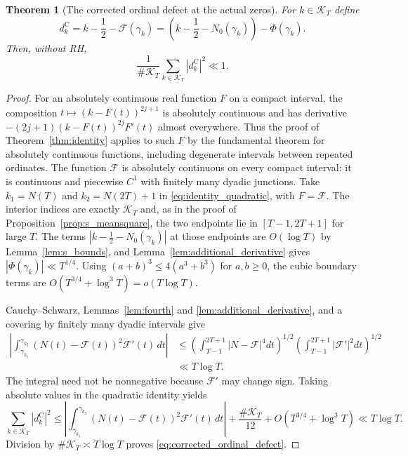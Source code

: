 \documentclass[11pt,a4paper]{article}
\makeatletter
\numberwithin{equation}{section}
\DeclareRobustCommand{\CGref}[1]{\ref{#1}}
\DeclareRobustCommand{\CGeqref}[1]{\eqref{#1}}
\let\CG@origref\ref
\let\CG@origeqref\eqref
\newcommand{\CG@gettip}[1]{\@ifundefined{CGTip@#1}{#1}{\csname CGTip@#1\endcsname}}
\DeclareRobustCommand{\CGref}[1]{\pdftooltip{\CG@origref{#1}}{\CG@gettip{#1}}}
\DeclareRobustCommand{\CGeqref}[1]{\pdftooltip{\CG@origeqref{#1}}{\CG@gettip{#1}}}
\newtheorem{theorem}{Theorem}[section]
\theoremstyle{definition}
\theoremstyle{remark}
\newcommand{\Nz}{N_0} %
\newcommand{\Fc}{\mathcal F}
\newcommand{\Ph}{\Phi}
\makeatother
\begin{document}
\begin{theorem}[The corrected ordinal defect at the actual zeros]\label{thm:corrected_ordinal_defect}
For $k\in\mathcal K_T$ define
\begin{equation}
 d_k^{\mathrm C}=k-\frac12-\Fc(\gamma_k)
 =\left(k-\frac12-\Nz(\gamma_k)\right)-\Ph(\gamma_k).
\label{eq:disp_43}
\end{equation}
Then, without RH,
\begin{equation}
\frac1{\#\mathcal K_T}\sum_{k\in\mathcal K_T}
|d_k^{\mathrm C}|^2\ll1.
\label{eq:corrected_ordinal_defect}
\end{equation}
\end{theorem}
\begin{proof}
For an absolutely continuous real function $F$ on a compact interval,
the composition $t\mapsto(k-F(t))^{2j+1}$ is absolutely continuous
and has derivative $-(2j+1)(k-F(t))^{2j}F'(t)$ almost everywhere.
Thus the proof of Theorem~\CGref{thm:identity} applies to such $F$
by the fundamental theorem for absolutely continuous functions,
including degenerate intervals between repeated ordinates.
The function $\Fc$ is absolutely continuous on every compact interval:
it is continuous and piecewise $C^1$ with finitely many dyadic junctions.
Take $k_1=N(T)$ and $k_2=N(2T)+1$ in
\CGeqref{eq:identity_quadratic}, with $F=\Fc$. The interior indices are
exactly $\mathcal K_T$ and, as in the proof of
Proposition~\CGref{prop:s_meansquare}, the two endpoints lie in
$[T-1,2T+1]$ for large $T$. The terms
$|k-\frac12-\Nz(\gamma_k)|$ at those endpoints are $O(\log T)$ by
Lemma~\CGref{lem:s_bounds}, and Lemma~\CGref{lem:additional_derivative}
gives $|\Ph(\gamma_k)|\ll T^{1/4}$.
Using $(a+b)^3\le4(a^3+b^3)$ for $a,b\ge0$, the cubic boundary terms are $O(T^{3/4}+\log^3T)=o(T\log T)$.

Cauchy--Schwarz, Lemmas~\CGref{lem:fourth} and
\CGref{lem:additional_derivative}, and a covering by finitely many dyadic
intervals give
\begin{equation}
\begin{aligned}
\left|\int_{\gamma_{k_1}}^{\gamma_{k_2}}
(N(t)-\Fc(t))^2\Fc'(t)\,dt\right|
&\le\left(\int_{T-1}^{2T+1}|N-\Fc|^4dt\right)^{1/2}
\left(\int_{T-1}^{2T+1}|\Fc'|^2dt\right)^{1/2}\\
&\ll T\log T.
\end{aligned}
\label{eq:disp_44}
\end{equation}
The integral need not be nonnegative because $\Fc'$ may change sign.
Taking absolute values in the quadratic identity yields
\begin{equation}
\sum_{k\in\mathcal K_T}|d_k^{\mathrm C}|^2
\le\left|\int_{\gamma_{k_1}}^{\gamma_{k_2}}
(N(t)-\Fc(t))^2\Fc'(t)\,dt\right|
+\frac{\#\mathcal K_T}{12}+O(T^{3/4}+\log^3T)
\ll T\log T.
\label{eq:disp_45}
\end{equation}
Division by $\#\mathcal K_T\asymp T\log T$ proves
\CGeqref{eq:corrected_ordinal_defect}.
\end{proof}
\end{document}
